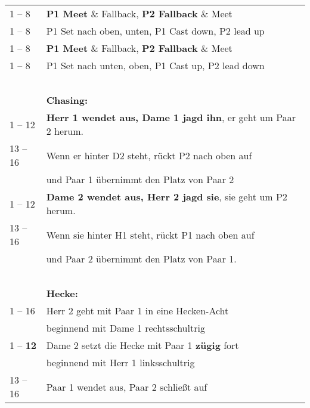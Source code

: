 \documentclass[
	12pt,
	]{scrartcl}
\newif\iffast
\newcommand{\dancedifficultmarker}{
	\iffast
	\else
		\begin{tikzpicture}[remember picture, overlay]
			\node[anchor=south, xshift=0cm, yshift=0.4cm, inner sep=0] at (current page.south){\pgfornament[width=5cm]{84}};
		\end{tikzpicture}
	\fi
}
\newcommand{\danceinstructionsbegin}{\begin{longtable}{p{1cm}p{9.8cm}}}
\newcommand{\danceinstructionsend}{\end{longtable}}
\newcommand{\danceinstructionsel}{~ & ~ \\}
\begin{document}
\danceinstructionsbegin
1 -- 8 	& \textbf{P1 Meet} \& Fallback, \textbf{P2 Fallback} \& Meet\\
1 -- 8  & P1 Set nach oben, unten, P1 Cast down, P2 lead up\\
1 -- 8 	& \textbf{P1 Meet} \& Fallback, \textbf{P2 Fallback} \& Meet\\
1 -- 8 	& P1 Set nach unten, oben, P1 Cast up, P2 lead down\\
\danceinstructionsel
& \textbf{Chasing:} \\
1 -- 12  & \textbf{Herr 1 wendet aus, Dame 1 jagd ihn}, er geht um Paar 2 herum.\\
13 -- 16 & Wenn er hinter D2 steht, rückt P2 nach oben auf\\
& und Paar 1 übernimmt den Platz von Paar 2 \\
1 -- 12  & \textbf{Dame 2 wendet aus, Herr 2 jagd sie}, sie geht um P2 herum. \\
13 -- 16 & Wenn sie hinter H1 steht, rückt P1 nach oben auf \\
& und Paar 2 übernimmt den Platz von Paar 1.\\
\danceinstructionsel
& \textbf{Hecke:} \\
1 -- 16 	& Herr 2 geht mit Paar 1 in eine Hecken-Acht\\
& beginnend mit Dame 1 rechtsschultrig \\
1 -- \textbf{12} & Dame 2 setzt die Hecke mit Paar 1 \textbf{zügig} fort\\
& beginnend mit Herr 1 linksschultrig \\
13 -- 16 	& Paar 1 wendet aus, Paar 2 schließt auf
\dancedifficultmarker
\danceinstructionsend


\newpage
\end{document}
